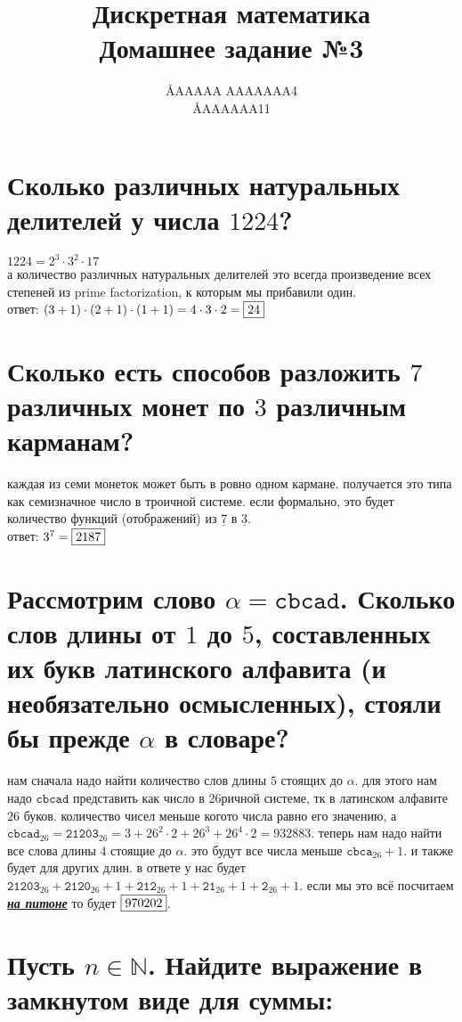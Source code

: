 \documentclass{article}
\title{Дискретная математика \\ Домашнее задание №3}
\author{\AA{AAAAA AAAAAAA}{4} \\ \AA{AAAAAA}{11}}
\newcommand{\N}{\mathbb{N}}
\newcommand{\range}{\underline}
\begin{document}
  \maketitle

  \section{Сколько различных натуральных делителей у числа $1224$?}
  $1224 = 2^3 \cdot 3^2 \cdot 17$ \\
  а количество различных натуральных делителей это всегда\cite{divisor} произведение всех степеней из prime factorization,
  к которым мы прибавили один. \\
  ответ: $(3+1)\cdot(2+1)\cdot(1+1) = 4\cdot3\cdot2 = \fbox{24}$

  \section{Сколько есть способов разложить $7$ различных монет по $3$ различным карманам?}
  каждая из семи монеток может быть в ровно одном кармане. получается это типа как семизначное число в троичной системе.
  если формально, это будет количество функций (отображений) из $\range{7}$ в $\range{3}$. \\
  ответ: $3^7 = \fbox{2187}$

  \section{Рассмотрим слово $\alpha = \texttt{cbcad}$. Сколько слов длины от $1$ до $5$, составленных их букв латинского алфавита (и необязательно осмысленных), стояли бы прежде $\alpha$ в словаре?}
  нам сначала надо найти количество слов длины $5$ стоящих до $\alpha$.
  для этого нам надо $\texttt{cbcad}$ представить как число в 26ричной системе, тк в латинском алфавите $26$ буков.
  количество чисел меньше когото числа равно его значению,
  а $\texttt{cbcad}_{26} = \texttt{21203}_{26} = 3+26^2\cdot2+26^3+26^4\cdot2 = 932883$.
  теперь нам надо найти все слова длины $4$ стоящие до $\alpha$. это будут все числа меньше $\texttt{cbca}_{26}+1$.
  и также будет для других длин.
  в ответе у нас будет $ \texttt{21203}_{26} + \texttt{2120}_{26}+1 + \texttt{212}_{26}+1 + \texttt{21}_{26}+1 + \texttt{2}_{26}+1$.
  если мы это всё посчитаем \underline{\textit{\textbf{\Large на питоне}}} то будет $\fbox{970202}$.

  \section{Пусть $n \in \N$. Найдите выражение в замкнутом виде для суммы:}
\end{document}
